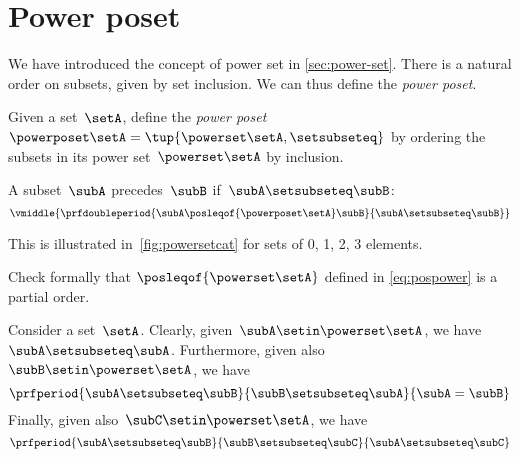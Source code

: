 
\section{Power poset}

We have introduced the concept of power set in \cref{sec:power-set}.
There is a natural order on subsets, given by set inclusion.
We can thus define the \emph{power poset}.

\begin{definition}
    \label{def:power-poset}
    Given a set~$\setA$,
    define the \emph{power poset}~$\powerposet\setA = \tup{\powerset\setA,\setsubseteq}$ by ordering the subsets in its power set~$\powerset\setA$ by inclusion.

    A subset~$\subA$ precedes~$\subB$ if~$\subA \setsubseteq \subB$:
    \begin{equation}
        \label{eq:pospower}
        \vmiddle{
            \prfdoubleperiod{
                \subA \posleqof{\powerposet\setA} \subB
            }{
                \subA \setsubseteq \subB
            }
        }
    \end{equation}
\end{definition}
This is illustrated in~\cref{fig:powersetcat} for sets of 0, 1, 2, 3 elements.
\begin{exercise}
    Check formally that $\posleqof{\powerset\setA}$ defined in \cref{eq:pospower} is a partial order.
\end{exercise}
\begin{solution}
    Consider a set~$\setA$.
    Clearly, given~$\subA\setin \powerset \setA$, we have~$\subA\setsubseteq \subA$.
    Furthermore, given also~$\subB\setin \powerset \setA$, we have
    \begin{equation}
        \prfperiod{\subA\setsubseteq \subB}{\subB\setsubseteq \subA}{\subA=\subB}
    \end{equation}
    Finally, given also~$\subC\setin \powerset \setA$, we have
    \begin{equation}
        \prfperiod{\subA\setsubseteq \subB}{\subB\setsubseteq \subC}{\subA\setsubseteq\subC}
    \end{equation}
\end{solution}
\vfill
\begin{figure*}[h]
    \centering
    \hfill
    \hfill
    \hfill
    \caption{Power set as a poset.
    }
    \label{fig:powersetcat}
\end{figure*}
\vfill
